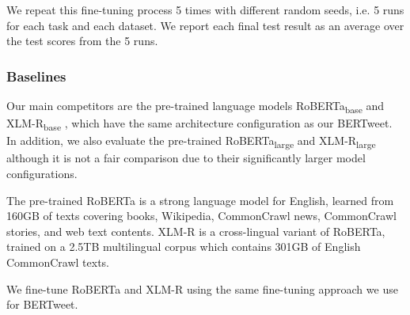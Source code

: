 \documentclass[11pt,a4paper]{article}
\begin{document}
We repeat this fine-tuning process 5 times with different random seeds, i.e. 5 runs for each task and each dataset. We report each final test result as an average over the test scores from the 5 runs. 


\subsubsection*{Baselines}

Our main competitors are the pre-trained language models RoBERTa\textsubscript{base} \citep{RoBERTa} and XLM-R\textsubscript{base} \citep{conneau2019unsupervised}, which have the same architecture configuration as our BERTweet. In addition, we also evaluate the pre-trained RoBERTa\textsubscript{large} and XLM-R\textsubscript{large} although it is not a fair comparison due to their significantly larger model configurations. 

The pre-trained RoBERTa is a strong language model for English, learned from 160GB of texts covering books, Wikipedia, CommonCrawl news, CommonCrawl stories, and web text contents. XLM-R  is a cross-lingual variant of RoBERTa, trained on a 2.5TB multilingual corpus which contains 301GB of English CommonCrawl texts. 

We fine-tune RoBERTa and XLM-R using the same fine-tuning approach  we use for BERTweet.
\end{document}
